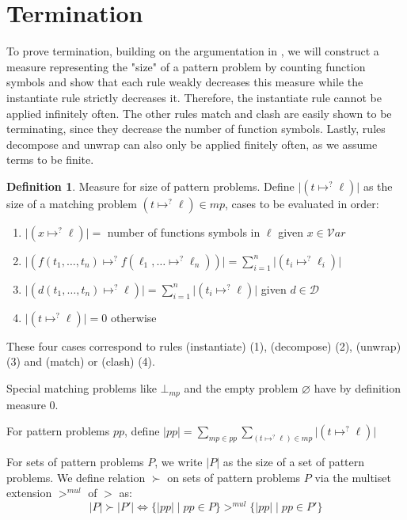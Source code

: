 \documentclass{report}
\theoremstyle{definition}
\newtheorem{definition_inner}{Definition}
\newenvironment{definition}
  {\begin{customblock}\begin{definition_inner}}
  {\end{definition_inner}\end{customblock}}
\begin{document}
\section{Termination}\label{section:termination}
To prove termination, building on the argumentation in \cite{thiemann}, we will construct a measure representing the "size" of a pattern problem by counting function symbols and show that each rule weakly decreases this measure while the instantiate rule strictly decreases it. Therefore, the instantiate rule cannot be applied infinitely often. The other rules match and clash are easily shown to be terminating, since they decrease the number of function symbols. Lastly, rules decompose and unwrap can also only be applied finitely often, as we assume terms to be finite.

\begin{definition}\label{def:termination}
Measure for size of pattern problems. Define $\lvert (t\mapsto^? \ell) \rvert$ as the size of a matching problem $(t\mapsto^? \ell) \in mp$, cases to be evaluated in order:
\begin{enumerate}
    \item $\lvert (x\mapsto^? \ell) \rvert = $ number of functions symbols in $\ell$ given $x \in \mathcal{V}ar$
    \item $\lvert (f(t_1, \dots, t_n) \mapsto^? f(\ell_1, \dots\mapsto^? \ell_n)) \rvert = \sum_{i=1}^n \lvert (t_i\mapsto^? \ell_i) \rvert$
    \item $\lvert (d(t_1, \dots, t_n)\mapsto^? \ell) \rvert = \sum_{i=1}^n \lvert (t_i\mapsto^? \ell) \rvert$ given $d \in \mathcal{D}$
    \item $\lvert (t\mapsto^? \ell) \rvert = 0$ otherwise
\end{enumerate}

These four cases correspond to rules (instantiate) (1), (decompose) (2), (unwrap) (3) and (match) or (clash) (4).

Special matching problems like $\bot_{mp}$ and the empty problem $\varnothing$ have by definition measure $0$.

For pattern problems $pp$, define $\lvert pp \rvert = \sum_{mp \in pp} \sum_{(t\mapsto^? \ell) \in mp} \lvert (t\mapsto^? \ell) \rvert$

For sets of pattern problems $P$, we write $\lvert P \rvert$ as the size of a set of pattern problems. We define relation $\succ$ on sets of pattern problems $P$ via the multiset extension $>^{mul}$ of $>$ as: 
$$\lvert P \rvert \succ \lvert P' \rvert \iff \{\lvert pp \rvert \mid pp \in P\} >^{mul} \{\lvert pp \rvert \mid pp \in P'\}$$
\end{definition}
\end{document}
